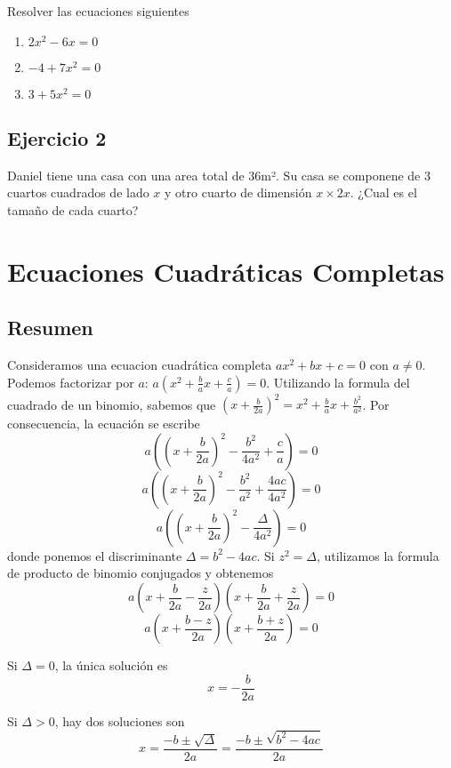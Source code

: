 Resolver las ecuaciones siguientes

\begin{enumerate}
\item $2x^2 - 6x = 0$
\item $-4 + 7x^2 = 0$
\item $3 + 5x^2 = 0$
\end{enumerate}

\subsection*{Ejercicio 2}

Daniel tiene una casa con una area total de $36$m². Su casa se componene
de 3 cuartos cuadrados de lado $x$ y otro cuarto de dimensión $x \times 2x$.
¿Cual es el tamaño de cada cuarto?

\section{Ecuaciones Cuadráticas Completas}

\subsection*{Resumen}

Consideramos una ecuacion cuadrática completa
$a x^2 + b x + c = 0$ con $a \neq 0$. Podemos factorizar por $a$:
$a \left( x^2 + \frac{b}{a} x + \frac{c}{a} \right) = 0$. Utilizando la
formula del cuadrado de un binomio,
sabemos que $\left( x + \frac{b}{2a}\right)^2 = 
x^2 + \frac{b}{a}x + \frac{b^2}{a^2}$. Por consecuencia, la ecuación se
escribe
$$a \left( \left( x + \frac{b}{2a}\right)^2 - \frac{b^2}{4a^2} + \frac{c}{a} \right) = 0$$
$$a \left( \left( x + \frac{b}{2a}\right)^2 - \frac{b^2}{a^2} + \frac{4ac}{4a^2} \right) = 0$$
$$a \left( \left( x + \frac{b}{2a}\right)^2 - \frac{\Delta}{4a^2} \right) = 0$$
donde ponemos el discriminante $\Delta = b^2 - 4ac$. Si $z^2 = \Delta$, 
utilizamos la formula de producto de binomio conjugados y obtenemos
$$a
\left( x + \frac{b}{2a} - \frac{z}{2a} \right)
\left( x + \frac{b}{2a} + \frac{z}{2a} \right) = 0$$
$$a
\left( x + \frac{b - z}{2a} \right)
\left( x + \frac{b + z}{2a} \right) = 0$$

Si $\Delta = 0$, la única solución es
$$
x = -\frac{b}{2a}
$$

Si $\Delta > 0$, hay dos soluciones son
$$
x = \frac{-b \pm \sqrt{\Delta}}{2a} = \frac{-b \pm \sqrt{b^2 - 4ac}}{2a}
$$

